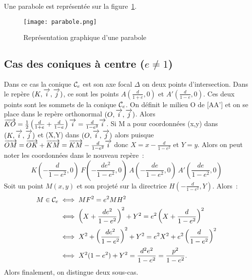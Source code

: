 Une parabole est représentée sur la figure~\ref{fig:parabole}.

\begin{figure}[!h]
  \centering
  \texttt{[image: parabole.png]}
  \caption{Représentation graphique d'une parabole}
  \label{fig:parabole}
\end{figure}


\subsection{Cas des coniques à centre (\(e\neq 1\))}
Dans ce cas la conique \(\mathcal{C}_{e}\) est son axe focal \(\Delta\) on deux points d'intersection. Dans le repère \((K,\overrightarrow{i},\overrightarrow{j})\), ce sont les points \(A(\frac{d}{1+e},0)\) et \(A'(\frac{d}{1-e},0)\). Ces deux points sont les sommets de la conique \(\mathcal{C}_{e}\). On définit le milieu O de [AA'] et on se place dans le repère orthonormal \((O,\overrightarrow{i},\overrightarrow{j})\). Alors \(\overrightarrow{KO}=\frac{1}{2}\left(\frac{d}{1+e}+\frac{d}{1-e}\right)\overrightarrow{i}=\frac{d}{1-e^2}\overrightarrow{i}\). Si M a pour coordonnées (x,y) dans \((K,\overrightarrow{i},\overrightarrow{j})\) et (X,Y) dans \((O,\overrightarrow{i},\overrightarrow{j})\) alors puisque \(\overrightarrow{OM}=\overrightarrow{OK}+\overrightarrow{KM}=\overrightarrow{KM}-\frac{d}{1-e^2}\overrightarrow{i}\) donc \(X=x-\frac{d}{1-e^2}\) et \(Y=y\). Alors on peut noter les coordonnées dans le nouveau repère~:
\begin{equation}
  K\left(-\frac{d}{1-e^2},0\right) \ F\left(-\frac{de^2}{1-e^2},0\right) \ A\left(-\frac{de}{1-e^2},0\right) \ A'\left(\frac{de}{1-e^2},0\right)
\end{equation}
Soit un point \(M(x,y)\) et son projeté sur la directrice \(H\left(-\frac{d}{1-e^2},Y\right)\). Alors~:
\begin{align}
  M \in \mathcal{C}_{e} &\iff MF^2=e^2 MH^2\\
  &\iff \left(X+\frac{de^2}{1-e^2}\right)^2+Y^2=e^2 \left(X+\frac{d}{1-e^2}\right)^2\\
  &\iff X^2+\left(\frac{de^2}{1-e^2}\right)^2+Y^2=e^2 X^2+e^2\left(\frac{d}{1-e^2}\right)^2\\
&\iff X^2(1-e^2)+Y^2=\frac{d^2e^2}{1-e^2}=\frac{p^2}{1-e^2}.
\end{align}
Alors finalement, on distingue deux sous-cas.

